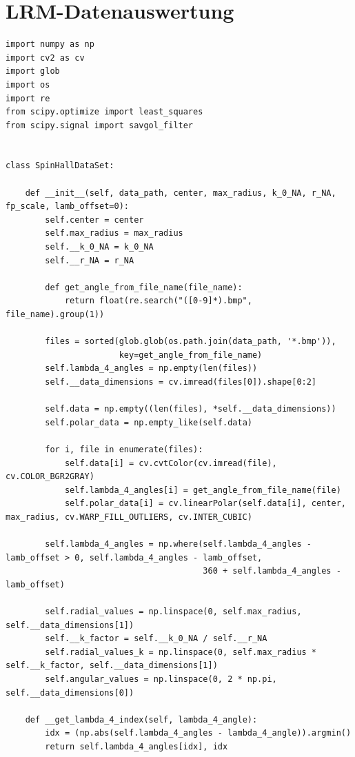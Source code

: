 \documentclass[a4paper, titlepage,  ngerman]{book}
\begin{document}
\section{LRM-Datenauswertung}
\begin{verbatim}
import numpy as np
import cv2 as cv
import glob
import os
import re
from scipy.optimize import least_squares
from scipy.signal import savgol_filter


class SpinHallDataSet:

    def __init__(self, data_path, center, max_radius, k_0_NA, r_NA, fp_scale, lamb_offset=0):
        self.center = center
        self.max_radius = max_radius
        self.__k_0_NA = k_0_NA
        self.__r_NA = r_NA

        def get_angle_from_file_name(file_name):
            return float(re.search("([0-9]*).bmp", file_name).group(1))

        files = sorted(glob.glob(os.path.join(data_path, '*.bmp')),
                       key=get_angle_from_file_name)
        self.lambda_4_angles = np.empty(len(files))
        self.__data_dimensions = cv.imread(files[0]).shape[0:2]

        self.data = np.empty((len(files), *self.__data_dimensions))
        self.polar_data = np.empty_like(self.data)

        for i, file in enumerate(files):
            self.data[i] = cv.cvtColor(cv.imread(file), cv.COLOR_BGR2GRAY)
            self.lambda_4_angles[i] = get_angle_from_file_name(file)
            self.polar_data[i] = cv.linearPolar(self.data[i], center, max_radius, cv.WARP_FILL_OUTLIERS, cv.INTER_CUBIC)

        self.lambda_4_angles = np.where(self.lambda_4_angles - lamb_offset > 0, self.lambda_4_angles - lamb_offset,
                                        360 + self.lambda_4_angles - lamb_offset)

        self.radial_values = np.linspace(0, self.max_radius, self.__data_dimensions[1])
        self.__k_factor = self.__k_0_NA / self.__r_NA
        self.radial_values_k = np.linspace(0, self.max_radius * self.__k_factor, self.__data_dimensions[1])
        self.angular_values = np.linspace(0, 2 * np.pi, self.__data_dimensions[0])

    def __get_lambda_4_index(self, lambda_4_angle):
        idx = (np.abs(self.lambda_4_angles - lambda_4_angle)).argmin()
        return self.lambda_4_angles[idx], idx


\end{verbatim}
\end{document}
